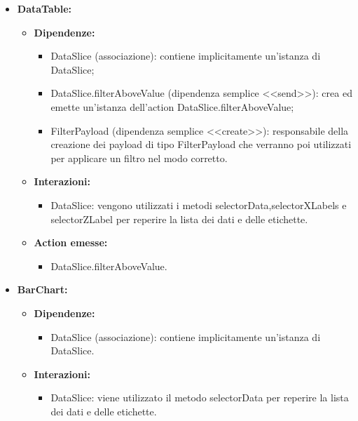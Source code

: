 \begin{itemize}
    \item \textbf{DataTable:}
          \begin{itemize}
              \item \textbf{Dipendenze:}
                    \begin{itemize}
                        \item DataSlice (associazione): contiene implicitamente un'istanza di DataSlice;
                        \item DataSlice.filterAboveValue (dipendenza semplice <<send>>): crea ed emette
                              un'istanza dell'action DataSlice.filterAboveValue;
                        \item FilterPayload (dipendenza semplice <<create>>): responsabile della creazione
                              dei payload di tipo FilterPayload che verranno poi utilizzati per applicare un
                              filtro nel modo corretto.
                    \end{itemize}
              \item \textbf{Interazioni:}
                    \begin{itemize}
                        \item DataSlice: vengono utilizzati i metodi selectorData,selectorXLabels e
                              selectorZLabel per reperire la lista dei dati e delle etichette.
                    \end{itemize}
              \item \textbf{Action emesse:}
                    \begin{itemize}
                        \item DataSlice.filterAboveValue.
                    \end{itemize}
          \end{itemize}

    \item \textbf{BarChart:}
          \begin{itemize}
              \item \textbf{Dipendenze:}
                    \begin{itemize}
                        \item DataSlice (associazione): contiene implicitamente un'istanza di DataSlice.
                    \end{itemize}
              \item \textbf{Interazioni:}
                    \begin{itemize}
                        \item DataSlice: viene utilizzato il metodo selectorData per reperire la lista dei
                              dati e delle etichette.
                    \end{itemize}
          \end{itemize}


\end{itemize}
